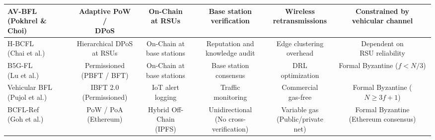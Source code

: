 \begin{table}
\begin{tabular*}{\textheight}{@{\extracolsep\fill}lccccc}
\makecell[l]{AV-BFL\\(Pokhrel \& Choi)~\cite{pokhrel2020federated}} & \makecell{Adaptive PoW /\\DPoS} & \makecell{On-Chain\\at RSUs} & \makecell{Base station\\verification} & \makecell{Wireless\\retransmissions} & \makecell{Constrained by\\vehicular channel} \\ \midrule
\makecell[l]{H-BCFL\\(Chai et al.)~\cite{chai2021hierarchical}} & \makecell{Hierarchical DPoS\\at RSUs} & \makecell{On-Chain at\\base stations} & \makecell{Reputation and\\knowledge audit} & \makecell{Edge clustering\\overhead} & \makecell{Dependent on\\RSU reliability} \\ \midrule
\makecell[l]{B5G-FL\\(Lu et al.)~\cite{lu2020blockchain}} & \makecell{Permissioned\\(PBFT / BFT)} & \makecell{On-Chain at\\base stations} & \makecell{Base station\\consensus} & \makecell{DRL\\optimization} & \makecell{Formal Byzantine\\($f < N/3$)} \\ \midrule
\makecell[l]{Vehicular BFL\\(Pujol et al.)~\cite{pujol2024blockchain}} & \makecell{IBFT 2.0\\(Permissioned)} & \makecell{IoT alert\\logging} & \makecell{Traffic\\monitoring} & \makecell{Commercial\\gas-free} & \makecell{Formal Byzantine\\($N \ge 3f + 1$)} \\ \midrule
\makecell[l]{BCFL-Ref\\(Goh et al.)~\cite{goh2023blockchain}} & \makecell{PoW / PoA\\(Ethereum)} & \makecell{Hybrid Off-Chain\\(IPFS)} & \makecell{Unidirectional\\(No cross-verification)} & \makecell{Variable gas\\(Public/private net)} & \makecell{Formal Byzantine\\(Ethereum consensus)} \\ \midrule

\end{tabular*}
\end{table}
